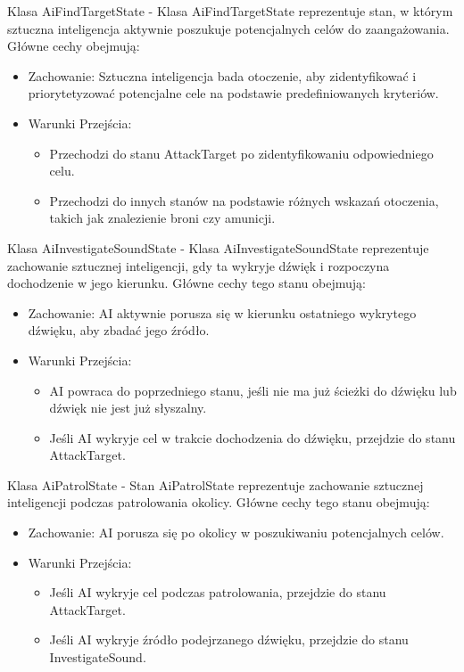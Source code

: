 Klasa AiFindTargetState -
Klasa AiFindTargetState reprezentuje stan, w którym sztuczna inteligencja aktywnie poszukuje potencjalnych celów do zaangażowania. Główne cechy obejmują:
\begin{itemize}
  \item Zachowanie: Sztuczna inteligencja bada otoczenie, aby zidentyfikować i priorytetyzować potencjalne cele na podstawie predefiniowanych kryteriów.
  \item Warunki Przejścia:
    \begin{itemize}
      \item Przechodzi do stanu AttackTarget po zidentyfikowaniu odpowiedniego celu.
      \item Przechodzi do innych stanów na podstawie różnych wskazań otoczenia, takich jak znalezienie broni czy amunicji.
    \end{itemize}
\end{itemize}

Klasa AiInvestigateSoundState -
Klasa AiInvestigateSoundState reprezentuje zachowanie sztucznej inteligencji, gdy ta wykryje dźwięk i rozpoczyna dochodzenie w jego kierunku. Główne cechy tego stanu obejmują:
\begin{itemize}
  \item Zachowanie: AI aktywnie porusza się w kierunku ostatniego wykrytego dźwięku, aby zbadać jego źródło.
  \item Warunki Przejścia:
    \begin{itemize}
      \item AI powraca do poprzedniego stanu, jeśli nie ma już ścieżki do dźwięku lub dźwięk nie jest już słyszalny.
      \item Jeśli AI wykryje cel w trakcie dochodzenia do dźwięku, przejdzie do stanu AttackTarget.
    \end{itemize}
\end{itemize}

Klasa AiPatrolState -
Stan AiPatrolState reprezentuje zachowanie sztucznej inteligencji podczas patrolowania okolicy. Główne cechy tego stanu obejmują:
\begin{itemize}
  \item Zachowanie: AI porusza się po okolicy w poszukiwaniu potencjalnych celów.
  \item Warunki Przejścia:
    \begin{itemize}
      \item Jeśli AI wykryje cel podczas patrolowania, przejdzie do stanu AttackTarget.
      \item Jeśli AI wykryje źródło podejrzanego dźwięku, przejdzie do stanu InvestigateSound.
    \end{itemize}
\end{itemize}

